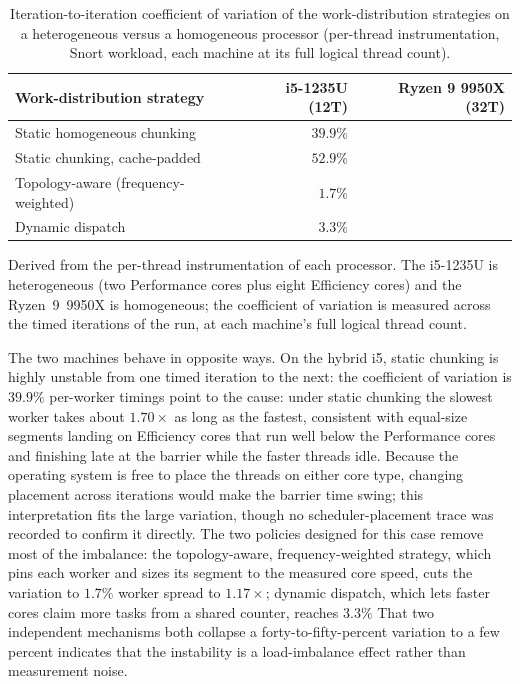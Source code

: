 \begin{table}[H]
    \centering
    \caption{Iteration-to-iteration coefficient of variation of the
    work-distribution strategies on a heterogeneous versus a homogeneous processor
    (per-thread instrumentation, Snort workload, each machine at its full logical
    thread count).}
    \label{tab:pe_balance}
    \small
    \begin{tabular}{@{} l r r @{}}
        \toprule
        \textbf{Work-distribution strategy} & \textbf{i5-1235U (12T)} & \textbf{Ryzen 9 9950X (32T)} \\
        \midrule
        Static homogeneous chunking          & $39.9\%$ \\
        Static chunking, cache-padded        & $52.9\%$ \\
        Topology-aware (frequency-weighted)  & $1.7\%$ \\
        Dynamic dispatch                     & $3.3\%$ \\
        \bottomrule
    \end{tabular}

    {\footnotesize\raggedright Derived from the per-thread instrumentation of each processor. The i5-1235U is heterogeneous (two Performance cores plus eight Efficiency cores) and the Ryzen~9~9950X is homogeneous; the coefficient of variation is measured across the timed iterations of the run, at each machine's full logical thread count.\par}
\end{table}

The two machines behave in opposite ways. On the hybrid i5, static chunking is
highly unstable from one timed iteration to the next: the coefficient of variation
is $39.9\%$
per-worker timings point to the cause: under static chunking the slowest worker
takes about $1.70\times$ as long as the fastest, consistent with equal-size
segments landing on Efficiency cores that run well below the Performance cores and
finishing late at the barrier while the faster threads idle. Because the operating
system is free to place the threads on either core type, changing placement across
iterations would make the barrier time swing; this interpretation fits the large
variation, though no scheduler-placement trace was recorded to confirm it directly.
The two policies designed for this case remove most of the imbalance: the
topology-aware, frequency-weighted strategy, which pins each worker and sizes its
segment to the measured core speed, cuts the variation to $1.7\%$
worker spread to $1.17\times$; dynamic dispatch, which lets faster cores claim more
tasks from a shared counter, reaches $3.3\%$
That two independent mechanisms both collapse a forty-to-fifty-percent variation to
a few percent indicates that the instability is a load-imbalance effect rather than
measurement noise.

